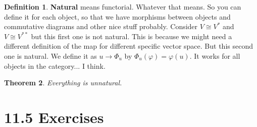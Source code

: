 \documentclass[9pt,reqno,twoside]{amsbook}
\theoremstyle{plain}
\newtheorem{theorem}{Theorem}[chapter]
\numberwithin{section}{chapter}
\numberwithin{equation}{chapter}
\theoremstyle{definition}
\newtheorem{Def}[theorem]{Definition}
\theoremstyle{remark}
\theoremstyle{plain}
\renewcommand{\phi}{\varphi}
\begin{document}
\begin{Def}
\textbf{Natural} means functorial. Whatever that means. So you can define it for each object, so that we have morphisms between objects and commutative diagrams and other nice stuff probably. Consider $V \cong V^*$ and $V \cong V^{**}$ but this first one is not natural. This is because we might need a different definition of the map for different specific vector space. But this second one is natural. We define it as $u \to \Phi_u$ by $\Phi_u(\phi) = \phi(u)$. It works for all objects in the category... I think. 
\end{Def}


\begin{theorem}
Everything is unnatural. 
\end{theorem}





\section*{11.5 Exercises} 
\end{document}
